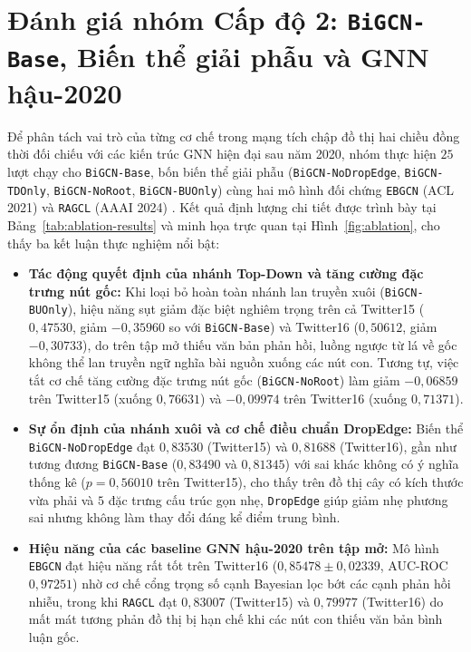 \documentclass[11pt,a4paper]{extreport}
\begin{document}
\section{Đánh giá nhóm Cấp độ 2: \texttt{BiGCN-Base}, Biến thể giải phẫu và GNN hậu-2020}

Để phân tách vai trò của từng cơ chế trong mạng tích chập đồ thị hai chiều đồng thời đối chiếu với các kiến trúc GNN hiện đại sau năm 2020, nhóm thực hiện $25$ lượt chạy cho \texttt{BiGCN-Base}, bốn biến thể giải phẫu (\texttt{BiGCN-NoDropEdge}, \texttt{BiGCN-TDOnly}, \texttt{BiGCN-NoRoot}, \texttt{BiGCN-BUOnly}) cùng hai mô hình đối chứng \texttt{EBGCN} (ACL 2021) \cite{wei_towards_2021} và \texttt{RAGCL} (AAAI 2024) \cite{cui_propagation_2024}. Kết quả định lượng chi tiết được trình bày tại Bảng~\ref{tab:ablation-results} và minh họa trực quan tại Hình~\ref{fig:ablation}, cho thấy ba kết luận thực nghiệm nổi bật:

\begin{itemize}
    \item \textbf{Tác động quyết định của nhánh Top-Down và tăng cường đặc trưng nút gốc:} Khi loại bỏ hoàn toàn nhánh lan truyền xuôi (\texttt{BiGCN-BUOnly}), hiệu năng sụt giảm đặc biệt nghiêm trọng trên cả Twitter15 ($0{,}47530$, giảm $-0{,}35960$ so với \texttt{BiGCN-Base}) và Twitter16 ($0{,}50612$, giảm $-0{,}30733$), do trên tập mở thiếu văn bản phản hồi, luồng ngược từ lá về gốc không thể lan truyền ngữ nghĩa bài nguồn xuống các nút con. Tương tự, việc tắt cơ chế tăng cường đặc trưng nút gốc (\texttt{BiGCN-NoRoot}) làm giảm $-0{,}06859$ trên Twitter15 (xuống $0{,}76631$) và $-0{,}09974$ trên Twitter16 (xuống $0{,}71371$).
    \item \textbf{Sự ổn định của nhánh xuôi và cơ chế điều chuẩn DropEdge:} Biến thể \texttt{BiGCN-NoDropEdge} đạt $0{,}83530$ (Twitter15) và $0{,}81688$ (Twitter16), gần như tương đương \texttt{BiGCN-Base} ($0{,}83490$ và $0{,}81345$) với sai khác không có ý nghĩa thống kê ($p = 0{,}56010$ trên Twitter15), cho thấy trên đồ thị cây có kích thước vừa phải và $5$ đặc trưng cấu trúc gọn nhẹ, \texttt{DropEdge} giúp giảm nhẹ phương sai nhưng không làm thay đổi đáng kể điểm trung bình.
    \item \textbf{Hiệu năng của các baseline GNN hậu-2020 trên tập mở:} Mô hình \texttt{EBGCN} đạt hiệu năng rất tốt trên Twitter16 ($0{,}85478 \pm 0{,}02339$, AUC-ROC $0{,}97251$) nhờ cơ chế cổng trọng số cạnh Bayesian lọc bớt các cạnh phản hồi nhiễu, trong khi \texttt{RAGCL} đạt $0{,}83007$ (Twitter15) và $0{,}79977$ (Twitter16) do mất mát tương phản đồ thị bị hạn chế khi các nút con thiếu văn bản bình luận gốc.
\end{itemize}
\end{document}
